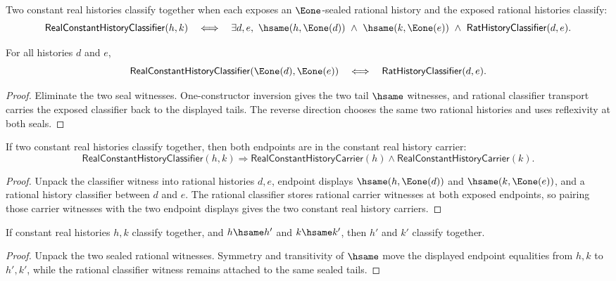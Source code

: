 \begin{definition}
\label{def:real-constant-history-classifier}
Two constant real histories classify together when each exposes an $\Eone$-sealed rational history and the exposed rational histories classify:
$$
\mathsf{RealConstantHistoryClassifier}(h,k)
\quad\Longleftrightarrow\quad
\exists d,e,\ \hsame(h,\Eone(d))\ \wedge\ \hsame(k,\Eone(e))
\ \wedge\ \mathsf{RatHistoryClassifier}(d,e).
$$
\end{definition}

\begin{theorem}
\label{thm:real-constant-history-classifier-e1-iff-rat}
For all histories $d$ and $e$,
$$
\mathsf{RealConstantHistoryClassifier}(\Eone(d),\Eone(e))
\quad\Longleftrightarrow\quad
\mathsf{RatHistoryClassifier}(d,e).
$$
\end{theorem}
\begin{proof}
Eliminate the two seal witnesses. One-constructor inversion gives the two tail
$\hsame$ witnesses, and rational classifier transport carries the exposed
classifier back to the displayed tails. The reverse direction chooses the same
two rational histories and uses reflexivity at both seals.
\end{proof}

\begin{theorem}
\label{thm:real-constant-history-classifier-endpoint-carriers}
If two constant real histories classify together, then both endpoints are in the
constant real history carrier:
$$
\mathsf{RealConstantHistoryClassifier}(h,k)
\Longrightarrow
\mathsf{RealConstantHistoryCarrier}(h)\land
\mathsf{RealConstantHistoryCarrier}(k).
$$
\end{theorem}
\begin{proof}
Unpack the classifier witness into rational histories $d,e$, endpoint displays
$\hsame(h,\Eone(d))$ and $\hsame(k,\Eone(e))$, and a rational history
classifier between $d$ and $e$. The rational classifier stores rational carrier
witnesses at both exposed endpoints, so pairing those carrier witnesses with the
two endpoint displays gives the two constant real history carriers.
\end{proof}

\begin{theorem}
\label{thm:real-constant-history-classifier-endpoint-transport}
If constant real histories $h,k$ classify together, and $h\hsame h'$ and
$k\hsame k'$, then $h'$ and $k'$ classify together.
\end{theorem}
\begin{proof}
Unpack the two sealed rational witnesses. Symmetry and transitivity of
$\hsame$ move the displayed endpoint equalities from $h,k$ to $h',k'$, while
the rational classifier witness remains attached to the same sealed tails.
\end{proof}

